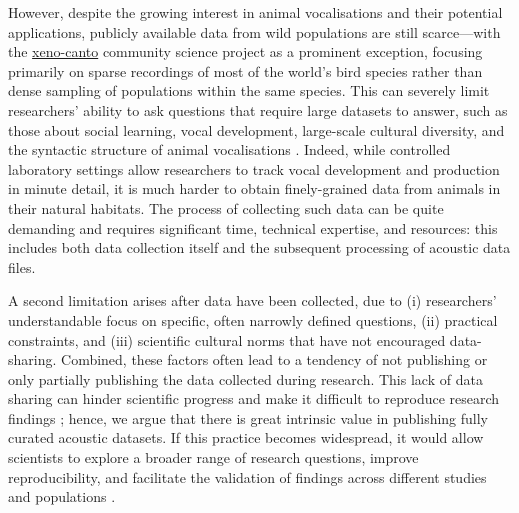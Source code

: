 However, despite the growing interest in animal vocalisations and their potential applications, publicly available data from wild populations are still scarce---with the \href{https://xeno-canto.org/}{xeno-canto} community science project as a prominent exception, focusing primarily on sparse recordings of most of the world's bird species rather than dense sampling of populations within the same species. This can severely limit researchers’ ability to ask questions that require large datasets to answer, such as those about social learning, vocal development, large-scale cultural diversity, and the syntactic structure of animal vocalisations \parencite{aplin2019, kollmorgen2020, lachlan2018, sainburg2019}. Indeed, while controlled laboratory settings allow researchers to track vocal development and production in minute detail, it is much harder to obtain finely-grained data from animals in their natural habitats. The process of collecting such data can be quite demanding and requires significant time, technical expertise, and resources: this includes both data collection itself and the subsequent processing of acoustic data files.

A second limitation arises after data have been collected, due to (i) researchers' understandable focus on specific, often narrowly defined questions, (ii) practical constraints, and (iii) scientific cultural norms that have not encouraged data-sharing. Combined, these factors often lead to a tendency of not publishing or only partially publishing the data collected during research. This lack of data sharing can hinder scientific progress and make it difficult to reproduce research findings \parencite{jenkins2023, powers2019, reichman2011, wilkinson2016}; hence, we argue that there is great intrinsic value in publishing fully curated acoustic datasets. If this practice becomes widespread, it would allow scientists to explore a broader range of research questions, improve reproducibility, and facilitate the validation of findings across different studies and populations \parencite{hersh2023, powers2019}.

